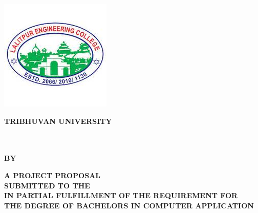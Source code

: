 \thispagestyle{empty}
\begin{center}
\begin{spacing}{1.6}

\includegraphics[scale=0.75]{img/Graphics/LEC.jpeg}

\textbf{
\large{TRIBHUVAN UNIVERSITY}\\
\MakeUppercase{\large{\theinstitute}}\\
\MakeUppercase{\large{\thecampus}}}

\vspace{0.5cm}

\hspace{-8cm}

\vspace{0.5cm}

\textbf{\MakeUppercase{\thetitle}\\
\vspace{0.5cm} 
BY \\ 
\MakeUppercase{\theauthor}}

\vspace{0.5cm}

\textbf{A PROJECT PROPOSAL\\
SUBMITTED TO THE \MakeUppercase{\thedepartment}\\ IN PARTIAL FULFILLMENT OF THE REQUIREMENT FOR\\ THE DEGREE OF BACHELORS IN COMPUTER APPLICATION}
\bigskip

\par
\textbf{\MakeUppercase{\thedepartment}}\\
\textbf{\MakeUppercase{\thedepartmentAddress}}
\vspace{1cm}

\textbf{\MakeUppercase{\thedate}}


\end{spacing}
\end{center}

\clearpage